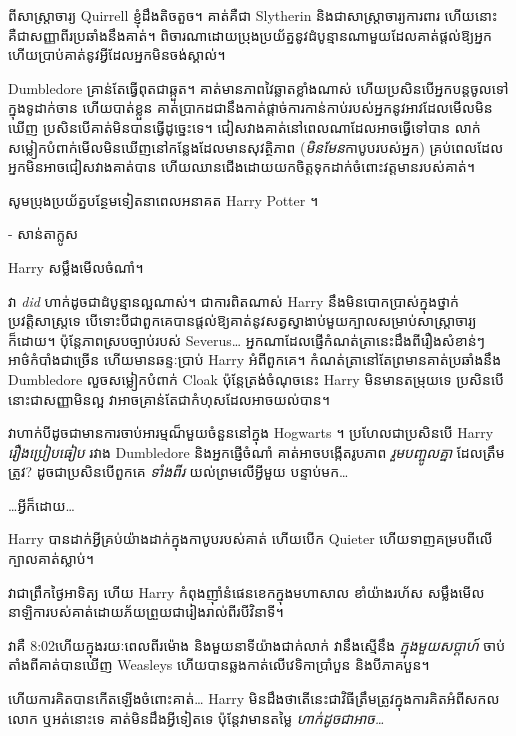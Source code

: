 {{{\begin{writtenNote}
ពីសាស្រ្តាចារ្យ Quirrell ខ្ញុំដឹងតិចតួច។ គាត់គឺជា Slytherin និងជាសាស្រ្តាចារ្យការពារ ហើយនោះគឺជាសញ្ញាពីរប្រឆាំងនឹងគាត់។ ពិចារណាដោយប្រុងប្រយ័ត្ននូវដំបូន្មានណាមួយដែលគាត់ផ្តល់ឱ្យអ្នក ហើយប្រាប់គាត់នូវអ្វីដែលអ្នកមិនចង់ស្គាល់។

Dumbledore គ្រាន់តែធ្វើពុតជាឆ្កួត។ គាត់មានភាពវៃឆ្លាតខ្លាំងណាស់ ហើយប្រសិនបើអ្នកបន្តចូលទៅក្នុងទូដាក់ចាន ហើយបាត់ខ្លួន គាត់ប្រាកដជានឹងកាត់ផ្តាច់ការកាន់កាប់របស់អ្នកនូវអាវដែលមើលមិនឃើញ ប្រសិនបើគាត់មិនបានធ្វើដូច្នេះទេ។ ជៀសវាងគាត់នៅពេលណាដែលអាចធ្វើទៅបាន លាក់សម្លៀកបំពាក់មើលមិនឃើញនៅកន្លែងដែលមានសុវត្ថិភាព (\emph{មិនមែន}កាបូបរបស់អ្នក) គ្រប់ពេលដែលអ្នកមិនអាចជៀសវាងគាត់បាន ហើយឈានជើងដោយយកចិត្តទុកដាក់ចំពោះវត្តមានរបស់គាត់។

សូមប្រុងប្រយ័ត្នបន្ថែមទៀតនាពេលអនាគត Harry Potter ។

- សាន់តាក្លូស
\end{writtenNote}

Harry សម្លឹងមើលចំណាំ។

វា \emph{did} ហាក់ដូចជាដំបូន្មានល្អណាស់។ ជាការពិតណាស់ Harry នឹងមិនបោកប្រាស់ក្នុងថ្នាក់ប្រវត្តិសាស្ត្រទេ បើទោះបីជាពួកគេបានផ្តល់ឱ្យគាត់នូវសត្វស្វាងាប់មួយក្បាលសម្រាប់សាស្រ្តាចារ្យក៏ដោយ។ ប៉ុន្តែភាពស្របច្បាប់របស់ Severus… អ្នកណាដែលផ្ញើកំណត់ត្រានេះដឹងពីរឿងសំខាន់ៗ អាថ៌កំបាំងជាច្រើន ហើយមានឆន្ទៈប្រាប់ Harry អំពីពួកគេ។ កំណត់ត្រានៅតែព្រមានគាត់ប្រឆាំងនឹង Dumbledore លួចសម្លៀកបំពាក់ Cloak ប៉ុន្តែត្រង់ចំណុចនេះ Harry មិនមានតម្រុយទេ ប្រសិនបើនោះជាសញ្ញាមិនល្អ វាអាចគ្រាន់តែជាកំហុសដែលអាចយល់បាន។

វាហាក់បីដូចជាមានការចាប់អារម្មណ៏មួយចំនួននៅក្នុង Hogwarts ។ ប្រហែលជាប្រសិនបើ Harry \emph{រឿងប្រៀបធៀប} រវាង Dumbledore និងអ្នកផ្ញើចំណាំ គាត់អាចបង្កើតរូបភាព \emph{រួមបញ្ចូលគ្នា} ដែលត្រឹមត្រូវ? ដូចជាប្រសិនបើពួកគេ \emph{ទាំងពីរ} យល់ព្រមលើអ្វីមួយ បន្ទាប់មក…

…អ្វីក៏ដោយ…

Harry បាន​ដាក់​អ្វី​គ្រប់​យ៉ាង​ដាក់​ក្នុង​កាបូប​របស់​គាត់ ហើយ​បើក Quieter ហើយ​ទាញ​គម្រប​ពីលើ​ក្បាល​គាត់​ស្លាប់។

\later

វាជាព្រឹកថ្ងៃអាទិត្យ ហើយ Harry កំពុងញ៉ាំនំផេនខេកក្នុងមហាសាល ខាំយ៉ាងរហ័ស សម្លឹងមើលនាឡិការបស់គាត់ដោយភ័យព្រួយជារៀងរាល់ពីរបីវិនាទី។

វាគឺ 8:02\am ហើយក្នុងរយៈពេលពីរម៉ោង និងមួយនាទីយ៉ាងជាក់លាក់ វានឹងស្មើនឹង \emph{ក្នុងមួយសប្តាហ៍} ចាប់តាំងពីគាត់បានឃើញ Weasleys ហើយបានឆ្លងកាត់លើវេទិកាប្រាំបួន និងបីភាគបួន។

ហើយការគិតបានកើតឡើងចំពោះគាត់… Harry មិនដឹងថាតើនេះជាវិធីត្រឹមត្រូវក្នុងការគិតអំពីសកលលោក ឬអត់នោះទេ គាត់មិនដឹងអ្វីទៀតទេ ប៉ុន្តែវាមានតម្លៃ \emph{ហាក់ដូចជាអាច…}

}}}
